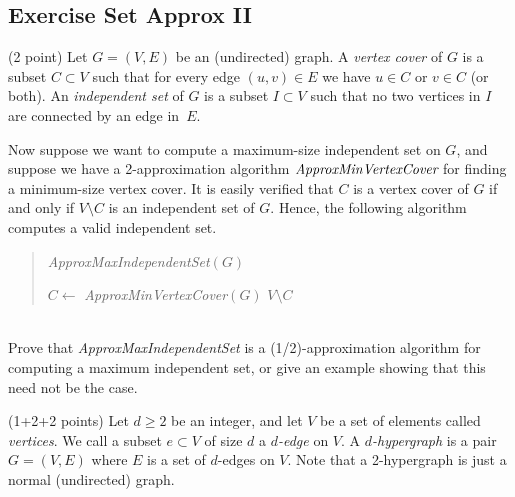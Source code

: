 \documentclass{article}
\renewcommand{\geq}{\geqslant}
\newcounter{rcounter}
\newenvironment{rlist}%
{\begin{list}{\setnr-\arabic{rcounter}}{\usecounter{rcounter}}}{\end{list}}
\begin{document}
	\subsection*{Exercise Set Approx II}
	\begin{rlist}
		\item (2 point)
		Let $G=(V,E)$ be an (undirected) graph.
		A \emph{vertex cover} of $G$  is a subset $C\subset V$ such that
		for every edge $(u,v)\in E$ we have $u\in C$ or $v\in C$ (or both).
		An \emph{independent set} of $G$ is a subset $I\subset V$ such that
		no two vertices in $I$ are connected by an edge in~$E$.
		
		Now suppose we want to compute a maximum-size independent set on $G$,
		and suppose we have a 2-approximation algorithm $\emph{ApproxMinVertexCover}$ for finding a minimum-size vertex cover. It is easily verified that $C$ is a vertex cover of $G$ 
		if and only if $V\setminus C$ is an independent set of $G$. 
		Hence, the following algorithm computes a valid independent set.
		\begin{algorithm}
			\vspace*{2mm}
			\begin{quotation}
				\noindent
				\emph{ApproxMaxIndependentSet}$(G)$ \\[-5mm]
				\begin{algorithmic}[1]
					\State $C \gets$ \emph{ApproxMinVertexCover}$(G)$  
					\State \Return $V\setminus C$
				\end{algorithmic}
			\end{quotation}
		\end{algorithm}
		\\
		Prove that \emph{ApproxMaxIndependentSet} is a
		(1/2)-approximation algorithm for computing a maximum independent set, 
		or give an example showing that this need not be the case.
		\item (1+2+2 points)
		Let $d\geq 2$ be an integer, and let $V$ be a set of elements called \emph{vertices}.
		We call a subset $e\subset V$ of size $d$ a \emph{$d$-edge} on $V$.
		A \emph{$d$-hypergraph} is a pair $G=(V,E)$ where $E$ is a set of $d$-edges on $V$.
		Note that a 2-hypergraph is just a normal (undirected) graph.
		

\end{rlist}
\end{document}
